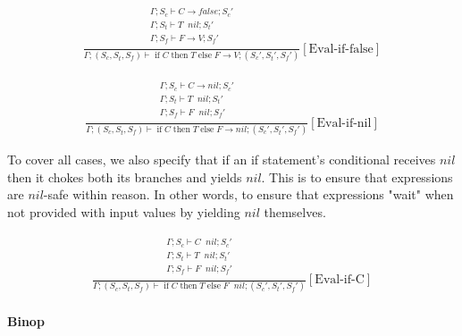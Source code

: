 \documentclass{scrartcl}
\DeclareMathOperator{\ifop}{if}
\DeclareMathOperator{\thenop}{then}
\DeclareMathOperator{\elseop}{else}
\DeclareMathOperator{\ceval}{\overset{C}{\rightarrow}}
\begin{document}
    \begin{align*}
    \frac{
        \begin{matrix}
        \Gamma; S_c \vdash C \rightarrow false; S_c' \\
        \Gamma; S_t \vdash T \ceval nil; S_t' \\
        \Gamma; S_f \vdash F \rightarrow V; S_f' \\
        \end{matrix}
    }{
        \Gamma; (S_c, S_t, S_f) \vdash \ifop C \thenop T \elseop F \rightarrow V; (S_c', S_t', S_f')
    }[\text{Eval-if-false}]
    \end{align*}
    
    \begin{align*}
    \frac{
        \begin{matrix}
        \Gamma; S_c \vdash C \rightarrow nil; S_c' \\
        \Gamma; S_t \vdash T \ceval nil; S_t' \\
        \Gamma; S_f \vdash F \ceval nil; S_f' \\
        \end{matrix}
    }{
        \Gamma; (S_c, S_t, S_f) \vdash \ifop C \thenop T \elseop F \rightarrow nil; (S_c', S_t', S_f')
    }[\text{Eval-if-nil}]
    \end{align*}
    
    To cover all cases, we also specify that if an if statement's conditional receives $nil$ then it chokes both its branches and yields $nil$. This is to ensure that expressions are $nil$-safe within reason. In other words, to ensure that expressions "wait" when not provided with input values by yielding $nil$ themselves.
    
    \begin{align*}
    \frac{
        \begin{matrix}
        \Gamma; S_c \vdash C \ceval nil; S_c' \\
        \Gamma; S_t \vdash T \ceval nil; S_t' \\
        \Gamma; S_f \vdash F \ceval nil; S_f' \\
        \end{matrix}
    }{
        \Gamma; (S_c, S_t, S_f) \vdash \ifop C \thenop T \elseop F \ceval nil; (S_c', S_t', S_f')
    }[\text{Eval-if-C}]
    \end{align*}
    
    \paragraph{Binop}
    
\end{document}
